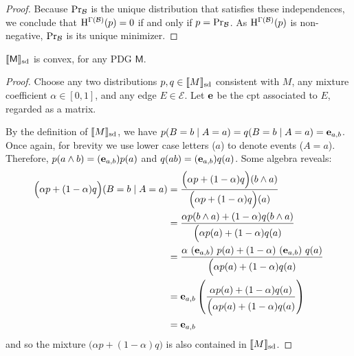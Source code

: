 \documentclass{article}
\newcommand{\Ed}{\mathcal E}
\newcommand{\sfM}{\mathsf M}
\newcommand\SD{_{\text{sd}}}
\begin{document}
\begin{proof}
	Because $\Pr_{\cal B}$ is the unique distribution that satisfies these independences, we conclude that $\mathrm{H}^{\Gamma(\cal B)}(p) = 0$ if and only if $p = \Pr_{\cal B}$. 	
	As $\mathrm{H}^{\Gamma(\cal B)}(p)$ is non-negative, $\Pr_{\cal B}$ is its unique minimizer. 


\end{proof}

\clearpage

\begin{lemma}
	\label{lem:convex}
	$\bbr{\sfM}\SD$ is convex, for any PDG  $\sfM$.
\end{lemma}%
\begin{proof}
	Choose any two distributions $p, q \in \bbr{M}\SD$ consistent with $M$, any mixture coefficient $\alpha \in [0,1]$, and any edge $E \in \Ed$. Let $\mathbf e$ be the cpt associated to $E$, regarded as a matrix. 
	
	By the definition of $\bbr{M}\SD$, we have $p(B = b \mid A = a) = q(B = b \mid A = a) = \mathbf e_{a,b}$.
	Once again, for brevity we use lower case letters ($a$) to denote events ($A = a$).
	Therefore, $p(a\land b) = (\mathbf e_{a,b})  p(a)$ and $q(ab) = (\mathbf e_{a,b})  q(a)$. Some algebra reveals:
	\begin{align*}
		\Big( \alpha p + (1-\alpha) q \Big) (B = b \mid A = a) &= 
		\frac{\Big( \alpha p + (1-\alpha) q \Big) (b \land a)}{\Big( \alpha p + (1-\alpha) q \Big) (a)} \\
		&= \frac{ \alpha p(b \land a) + (1-\alpha) q(b \land a) }{\Big( \alpha p(a) + (1-\alpha) q (a)} \\
		&= \frac{ \alpha\ (\mathbf e_{a,b})\  p(a) + (1-\alpha)\  (\mathbf e_{a,b})\  q(a) }{\Big( \alpha p(a) + (1-\alpha) q (a)} \\
		&=\mathbf e_{a,b} \left(\frac{ \alpha  p(a) + (1-\alpha) q(a) }{\Big( \alpha p(a) + (1-\alpha) q (a)}\right)\\
		&= \mathbf e_{a,b}
	\end{align*}
	and so the mixture $\Big(\alpha p + (1-\alpha) q \Big)$ is also contained in $\bbr{M}\SD$.
\end{proof}
\end{document}
